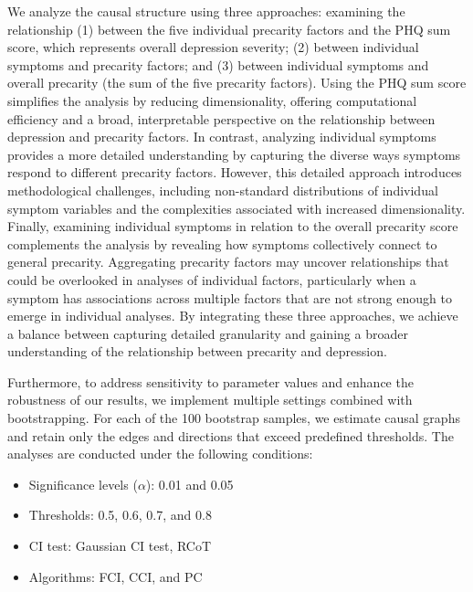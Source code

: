 \documentclass[
]{article}
\providecommand{\tightlist}{%
  \setlength{\itemsep}{0pt}\setlength{\parskip}{0pt}}\usepackage{longtable,booktabs,array}
\begin{document}
We analyze the causal structure using three approaches: examining the
relationship (1) between the five individual precarity factors and the
PHQ sum score, which represents overall depression severity; (2) between
individual symptoms and precarity factors; and (3) between individual
symptoms and overall precarity (the sum of the five precarity factors).
Using the PHQ sum score simplifies the analysis by reducing
dimensionality, offering computational efficiency and a broad,
interpretable perspective on the relationship between depression and
precarity factors. In contrast, analyzing individual symptoms provides a
more detailed understanding by capturing the diverse ways symptoms
respond to different precarity factors. However, this detailed approach
introduces methodological challenges, including non-standard
distributions of individual symptom variables and the complexities
associated with increased dimensionality. Finally, examining individual
symptoms in relation to the overall precarity score complements the
analysis by revealing how symptoms collectively connect to general
precarity. Aggregating precarity factors may uncover relationships that
could be overlooked in analyses of individual factors, particularly when
a symptom has associations across multiple factors that are not strong
enough to emerge in individual analyses. By integrating these three
approaches, we achieve a balance between capturing detailed granularity
and gaining a broader understanding of the relationship between
precarity and depression.

Furthermore, to address sensitivity to parameter values and enhance the
robustness of our results, we implement multiple settings combined with
bootstrapping. For each of the 100 bootstrap samples, we estimate causal
graphs and retain only the edges and directions that exceed predefined
thresholds. The analyses are conducted under the following conditions:

\begin{itemize}
\tightlist
\item
  Significance levels (\(\alpha\)): 0.01 and 0.05
\item
  Thresholds: 0.5, 0.6, 0.7, and 0.8
\item
  CI test: Gaussian CI test, RCoT
\item
  Algorithms: FCI, CCI, and PC
\end{itemize}
\end{document}
